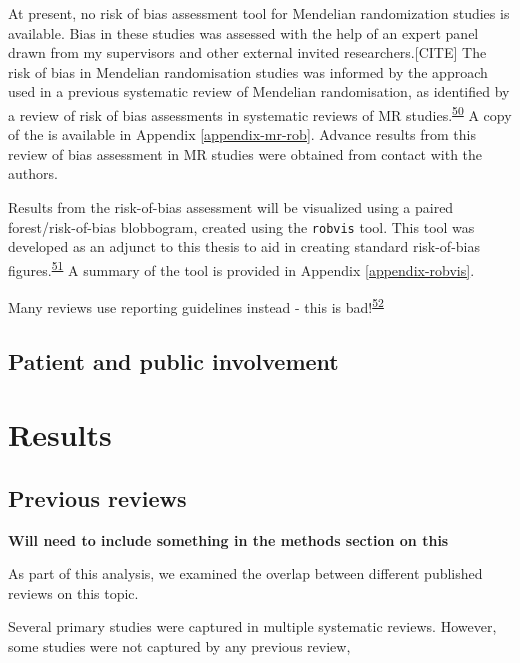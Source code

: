 \documentclass[a4paper, twoside]{templates/ociamthesis}
\begin{document}
At present, no risk of bias assessment tool for Mendelian randomization studies is available. Bias in these studies was assessed with the help of an expert panel drawn from my supervisors and other external invited researchers.{[}CITE{]} The risk of bias in Mendelian randomisation studies was informed by the approach used in a previous systematic review of Mendelian randomisation, as identified by a review of risk of bias assessments in systematic reviews of MR studies.\textsuperscript{\protect\hyperlink{ref-mamluk2020}{50}} A copy of the is available in Appendix \ref{appendix-mr-rob}. Advance results from this review of bias assessment in MR studies were obtained from contact with the authors.

Results from the risk-of-bias assessment will be visualized using a paired forest/risk-of-bias blobbogram, created using the \texttt{robvis} tool. This tool was developed as an adjunct to this thesis to aid in creating standard risk-of-bias figures.\textsuperscript{\protect\hyperlink{ref-mcguinness2019}{51}} A summary of the tool is provided in Appendix \ref{appendix-robvis}.

Many reviews use reporting guidelines instead - this is bad!\textsuperscript{\protect\hyperlink{ref-costa2011}{52}}

\hypertarget{patient-and-public-involvement}{%
\subsection{Patient and public involvement}\label{patient-and-public-involvement}}

\hypertarget{results}{%
\section{Results}\label{results}}

\hypertarget{previous-reviews}{%
\subsection{Previous reviews}\label{previous-reviews}}

\textbf{Will need to include something in the methods section on this}

As part of this analysis, we examined the overlap between different published reviews on this topic.

Several primary studies were captured in multiple systematic reviews. However, some studies were not captured by any previous review,
\end{document}
